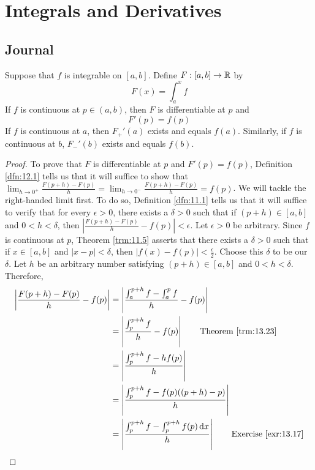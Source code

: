 \documentclass[../main.tex]{subfiles}
\begin{document}
\chapter{Integrals and Derivatives}\label{sct:14}
\section{Journal}
\begin{theorem}\label{trm:14.1}
    Suppose that $f$ is integrable on $[a,b]$. Define $F:[a,b]\to\mathbb{R}$ by
    \begin{equation*}
        F(x) = \int_a^xf
    \end{equation*}
    If $f$ is continuous at $p\in(a,b)$, then $F$ is differentiable at $p$ and
    \begin{equation*}
        F'(p) = f(p)
    \end{equation*}
    If $f$ is continuous at $a$, then $F_+'(a)$ exists and equals $f(a)$. Similarly, if $f$ is continuous at $b$, $F_-'(b)$ exists and equals $f(b)$.
    \begin{proof}
        To prove that $F$ is differentiable at $p$ and $F'(p)=f(p)$, Definition \ref{dfn:12.1} tells us that it will suffice to show that $\lim_{h\to 0^+}\frac{F(p+h)-F(p)}{h}=\lim_{h\to 0^-}\frac{F(p+h)-F(p)}{h}=f(p)$. We will tackle the right-handed limit first. To do so, Definition \ref{dfn:11.1} tells us that it will suffice to verify that for every $\epsilon>0$, there exists a $\delta>0$ such that if $(p+h)\in[a,b]$ and $0<h<\delta$, then $|\frac{F(p+h)-F(p)}{h}-f(p)|<\epsilon$. Let $\epsilon>0$ be arbitrary. Since $f$ is continuous at $p$, Theorem \ref{trm:11.5} asserts that there exists a $\delta>0$ such that if $x\in[a,b]$ and $|x-p|<\delta$, then $|f(x)-f(p)|<\frac{\epsilon}{2}$. Choose this $\delta$ to be our $\delta$. Let $h$ be an arbitrary number satisfying $(p+h)\in[a,b]$ and $0<h<\delta$. Therefore,
        \begingroup
        \allowdisplaybreaks
        \begin{align*}
            \left| \frac{F(p+h)-F(p)}{h}-f(p) \right| &= \left| \frac{\int_a^{p+h}f-\int_a^pf}{h}-f(p) \right|\\
            &= \left| \frac{\int_p^{p+h}f}{h}-f(p) \right|\tag*{Theorem \ref{trm:13.23}}\\
            &= \left| \frac{\int_p^{p+h}f-hf(p)}{h} \right|\\
            &= \left| \frac{\int_p^{p+h}f-f(p)((p+h)-p)}{h} \right|\\
            &= \left| \frac{\int_p^{p+h}f-\int_p^{p+h}f(p)\dd{x}}{h} \right|\tag*{Exercise \ref{exr:13.17}}\\

\end{align*}
\end{proof}
\end{theorem}
\end{document}
